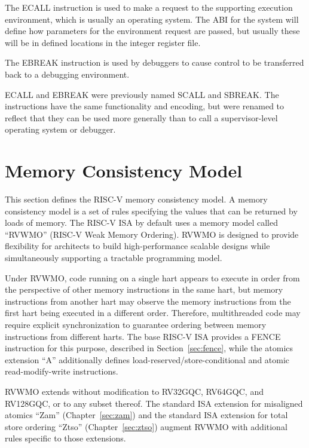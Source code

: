 The ECALL instruction is used to make a request to the supporting
execution environment, which is usually an operating system.  The ABI
for the system will define how parameters for the environment request
are passed, but usually these will be in defined locations in the
integer register file.

The EBREAK instruction is used by debuggers to cause control to be
transferred back to a debugging environment.

\begin{commentary}
ECALL and EBREAK were previously named SCALL and SBREAK.  The
instructions have the same functionality and encoding, but were
renamed to reflect that they can be used more generally than to call a
supervisor-level operating system or debugger.
\end{commentary}

\section{Memory Consistency Model}
\label{sec:memorymodel}

This section defines the RISC-V memory consistency model.
A memory consistency model is a set of rules specifying the values that can be returned by loads of memory.
The RISC-V ISA by default uses a memory model called ``RVWMO'' (RISC-V Weak Memory Ordering).
RVWMO is designed to provide flexibility for architects to build high-performance scalable designs while simultaneously supporting a tractable programming model.

Under RVWMO, code running on a single hart appears to execute in order from the perspective of other memory instructions in the same hart, but memory instructions from another hart may observe the memory instructions from the first hart being executed in a different order.
Therefore, multithreaded code may require explicit synchronization to guarantee ordering between memory instructions from different harts.
The base RISC-V ISA provides a FENCE instruction for this purpose, described in Section~\ref{sec:fence}, while the atomics extension ``A'' additionally defines load-reserved/store-conditional and atomic read-modify-write instructions.

RVWMO extends without modification to RV32GQC, RV64GQC, and RV128GQC, or to any subset thereof.
The standard ISA extension for misaligned atomics ``Zam'' (Chapter~\ref{sec:zam}) and the standard ISA extension for total store ordering ``Ztso'' (Chapter~\ref{sec:ztso}) augment RVWMO with additional rules specific to those extensions.

